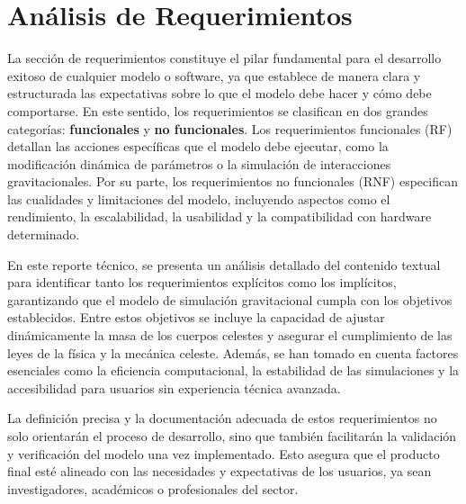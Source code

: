 \section{Análisis de Requerimientos}

La sección de requerimientos constituye el pilar fundamental para el desarrollo exitoso de cualquier modelo o software, ya que establece de manera clara y estructurada las expectativas sobre lo que el modelo debe hacer y cómo debe comportarse. En este sentido, los requerimientos se clasifican en dos grandes categorías: \textbf{funcionales} y \textbf{no funcionales}. Los requerimientos funcionales (RF) detallan las acciones específicas que el modelo debe ejecutar, como la modificación dinámica de parámetros o la simulación de interacciones gravitacionales. Por su parte, los requerimientos no funcionales (RNF) especifican las cualidades y limitaciones del modelo, incluyendo aspectos como el rendimiento, la escalabilidad, la usabilidad y la compatibilidad con hardware determinado.

En este reporte técnico, se presenta un análisis detallado del contenido textual para identificar tanto los requerimientos explícitos como los implícitos, garantizando que el modelo de simulación gravitacional cumpla con los objetivos establecidos. Entre estos objetivos se incluye la capacidad de ajustar dinámicamente la masa de los cuerpos celestes y asegurar el cumplimiento de las leyes de la física y la mecánica celeste. Además, se han tomado en cuenta factores esenciales como la eficiencia computacional, la estabilidad de las simulaciones y la accesibilidad para usuarios sin experiencia técnica avanzada.

La definición precisa y la documentación adecuada de estos requerimientos no solo orientarán el proceso de desarrollo, sino que también facilitarán la validación y verificación del modelo una vez implementado. Esto asegura que el producto final esté alineado con las necesidades y expectativas de los usuarios, ya sean investigadores, académicos o profesionales del sector.

\newpage
